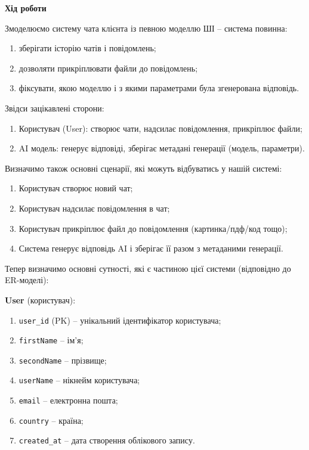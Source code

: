 \documentclass[12pt,a4paper]{article}
\begin{document}
    \begin{center} \textbf{\large Хід роботи} \end{center}

    \noindent
    Змоделюємо систему чата клієнта із певною моделлю ШІ -- система повинна:

    \begin{enumerate}
        \item зберігати історію чатів і повідомлень;
        \item дозволяти прикріплювати файли до повідомлень;
        \item фіксувати, якою моделлю і з якими параметрами була згенерована відповідь.
    \end{enumerate}

    \noindent
    Звідси зацікавлені сторони:

    \begin{enumerate}
        \item Користувач (User): створює чати, надсилає повідомлення, прикріплює файли;
        \item AI модель: генерує відповіді, зберігає метадані генерації (модель, параметри).
    \end{enumerate}

    \noindent
    Визначимо також основні сценарії, які можуть відбуватись у нашій системі:

    \begin{enumerate}
        \item Користувач створює новий чат;
        \item Користувач надсилає повідомлення в чат;
        \item Користувач прикріплює файл до повідомлення (картинка/пдф/код тощо);
        \item Система генерує відповідь AI і зберігає її разом з метаданими генерації.
    \end{enumerate}

    \noindent
    Тепер визначимо основні сутності, які є частиною цієї системи (відповідно до ER-моделі):

    \vspace{1em}

    \noindent
    \textbf{User} (користувач):

    \begin{enumerate}
        \item \texttt{user\_id} (PK) -- унікальний ідентифікатор користувача;
        \item \texttt{firstName} -- ім'я;
        \item \texttt{secondName} -- прізвище;
        \item \texttt{userName} -- нікнейм користувача;
        \item \texttt{email} -- електронна пошта;
        \item \texttt{country} -- країна;
        \item \texttt{created\_at} -- дата створення облікового запису.
    \end{enumerate}
\end{document}
